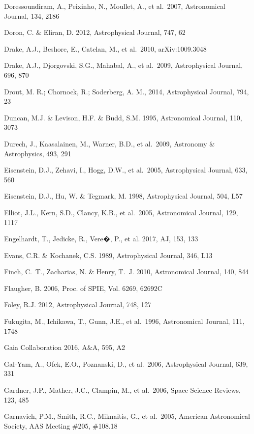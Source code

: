 \documentclass{emulateapj}
\begin{document}
\begin{thebibliography}{}
\bibitem[()]{} Doressoundiram, A., Peixinho, N., Moullet, A., et al.~2007, Astronomical Journal, 134, 2186

\bibitem[()]{} Doron, C. \& Eliran, D. 2012, Astrophysical Journal, 747, 62

\bibitem[()]{} Drake, A.J., Beshore, E., Catelan, M., et al.~2010, arXiv:1009.3048

\bibitem[()]{} Drake, A.J., Djorgovski, S.G., Mahabal, A., et al.~2009, Astrophysical Journal, 696, 870


\bibitem[()]{} Drout, M. R.; Chornock, R.; Soderberg, A. M., 2014, Astrophysical Journal,  794, 23

\bibitem[()]{} Duncan, M.J. \& Levison, H.F. \& Budd, S.M. 1995, Astronomical Journal, 110, 3073

\bibitem[()]{} Durech, J., Kaasalainen, M., Warner, B.D., et al.~2009, Astronomy \& Astrophysics, 493, 291

\bibitem[()]{} Eisenstein, D.J., Zehavi, I., Hogg, D.W., et al.~2005, Astrophysical Journal, 633, 560

\bibitem[()]{} Eisenstein, D.J., Hu, W. \& Tegmark, M. 1998, Astrophysical Journal, 504, L57

\bibitem[()]{} Elliot, J.L., Kern, S.D., Clancy, K.B., et al.~2005,  Astronomical Journal, 129, 1117

\bibitem[()]{} Engelhardt, T., Jedicke, R., Vere�, P., et al. 2017, AJ, 153, 133

\bibitem[()]{} Evans, C.R. \& Kochanek, C.S. 1989, Astrophysical Journal, 346, L13

\bibitem[()]{} Finch, C.~T., Zacharias, N. \& Henry, T.~J. 2010, Astronomical Journal, 140, 844

\bibitem[()]{} Flaugher, B. 2006, Proc. of SPIE, Vol. 6269, 62692C

\bibitem[()]{} Foley, R.J. 2012, Astrophysical Journal, 748, 127

\bibitem[()]{} Fukugita, M., Ichikawa, T., Gunn, J.E., et al.~1996, Astronomical Journal, 111, 1748

\bibitem[()]{} Gaia Collaboration 2016, A\&A, 595, A2

\bibitem[()]{} Gal-Yam, A., Ofek, E.O., Poznanski, D., et al.~2006, Astrophysical Journal, 639, 331

\bibitem[()]{} Gardner, J.P., Mather, J.C., Clampin, M., et al.~2006, Space Science Reviews, 123, 485

\bibitem[()]{} Garnavich, P.M., Smith, R.C., Miknaitis, G., et al.~2005,
             American Astronomical Society, AAS Meeting \#205, \#108.18


\end{thebibliography}
\end{document}
